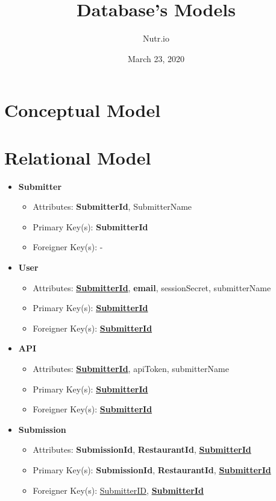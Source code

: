 \documentclass{article}
\title{Database's Models}
\date{March 23, 2020}
\author{Nutr.io}
\begin{document}
\maketitle

\section{Conceptual Model}

\section{Relational Model}
    \begin{itemize}
        \item \textbf{Submitter}        
        \begin{itemize}
            \item Attributes: \textbf{SubmitterId}, SubmitterName
            \item Primary Key(s): \textbf{SubmitterId}
            \item Foreigner Key(s): -
        \end{itemize}

        \item \textbf{User}
        \begin{itemize}
            \item Attributes: \textbf{\underline{SubmitterId}}, \textbf{email}, sessionSecret, submitterName
            \item Primary Key(s): \textbf{\underline{SubmitterId}}
            \item Foreigner Key(s): \textbf{\underline{SubmitterId}}
        \end{itemize}

        \item \textbf{API}
        \begin{itemize}
            \item Attributes: \textbf{\underline{SubmitterId}}, apiToken, submitterName
            \item Primary Key(s): \textbf{\underline{SubmitterId}}
            \item Foreigner Key(s): \textbf{\underline{SubmitterId}}
        \end{itemize}

        \item \textbf{Submission}                
        \begin{itemize}
            \item Attributes: \textbf{SubmissionId}, \textbf{RestaurantId}, \textbf{\underline{SubmitterId}}
            \item Primary Key(s): \textbf{SubmissionId}, \textbf{RestaurantId}, \textbf{\underline{SubmitterId}}
            \item Foreigner Key(s): \underline{SubmitterID}, \textbf{\underline{SubmitterId}}
        \end{itemize}


\end{itemize}
\end{document}

